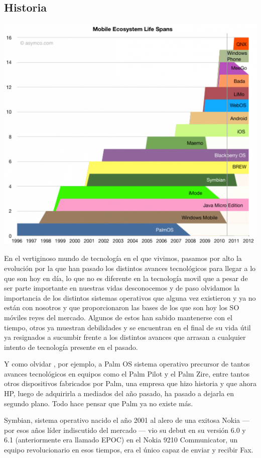 \subsection*{Historia}
\includegraphics[scale=0.5]{img/cp01/img0101.png} 

En el vertiginoso mundo de tecnología en el que vivimos, pasamos por alto la evolución por la que han pasado los distintos avances tecnológicos para llegar a lo que son hoy 
en día, lo que no es diferente en la tecnología movil que a pesar de ser parte importante en nuestras vidas desconocemos y de paso olvidamos la importancia de los distintos 
sistemas operativos que alguna vez existieron y ya no están con nosotros y que proporcionaron las bases de los que son hoy los SO móviles reyes del mercado. Algunos de 
estos han sabido mantenerse con el tiempo, otros ya muestran debilidades y se encuentran en el final de su vida útil ya resignados a sucumbir frente a los distintos avances 
que arrasan a cualquier intento de tecnología presente en el pasado.

Y como olvidar , por ejemplo,  a Palm OS sistema operativo precursor de tantos avances tecnológicos en equipos como el Palm Pilot y el Palm Zire, entre tantos otros 
dispositivos fabricados por Palm, una empresa que hizo historia y que ahora HP, luego de adquirirla a mediados del año pasado, ha pasado a dejarla en segundo plano. Todo 
hace pensar que Palm ya no existe más.

Symbian, sistema operativo nacido el año 2001 al alero de una exitosa Nokia — por esos años líder indiscutido del mercado — vio su debut en su versión 6.0 y 6.1 
(anteriormente era llamado EPOC) en el Nokia 9210 Communicator, un equipo revolucionario en esos tiempos, era el único capaz de enviar y recibir Fax.

